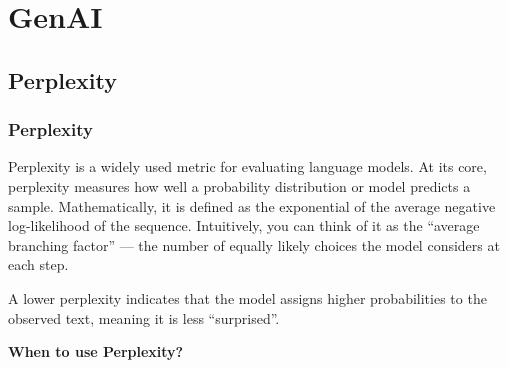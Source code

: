 \chapter{GenAI}


\clearpage
\thispagestyle{genaistyle}
\section{Perplexity}
\subsection{Perplexity}


Perplexity is a widely used metric for evaluating language models. At its core, perplexity measures how well a probability distribution or model
predicts a sample. Mathematically, it is defined as the exponential of the average negative log-likelihood of the sequence. Intuitively, you can
think of it as the “average branching factor” — the number of equally likely choices the model considers at each step.

\begin{center}
\end{center}

A lower perplexity indicates that the model assigns higher probabilities to the observed text, meaning it is less “surprised”.

\textbf{When to use Perplexity?}

